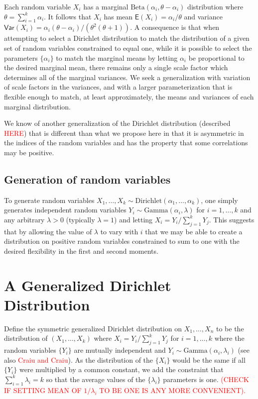 \documentclass[ba]{imsart}
\numberwithin{equation}{section}
\theoremstyle{plain}
\newcommand{\falta}[1]{\textcolor{red}{#1}}
\begin{document}
Each random variable $X_i$ has a marginal
$\text{Beta}(\alpha_i,\theta-\alpha_i)$ distribution where $\theta =
\sum_{i=1}^k \alpha_i$.  It follows that $X_i$ has mean
$\mathsf{E}(X_i) = \alpha_i/\theta$ and variance $\mathsf{Var}(X_i) =
\alpha_i(\theta-\alpha_i) / ( \theta^2(\theta+1) )$.  A consequence is
that when attempting to select a Dirichlet distribution to match the
distribution of a given set of random variables constrained to equal
one, while it is possible to select the parameters $\{\alpha_i\}$ to
match the marginal means by letting $\alpha_i$ be proportional to the
desired marginal mean, there remains only a single scale factor which
determines all of the marginal variances.  We seek a generalization
with variation of scale factors in the variances, and with a larger
parameterization that is flexible enough to match, at least
approximately, the means and variances of each marginal distribution.

We know of another generalization of the Dirichlet distribution
(described \falta{HERE}) that is different than what we propose here
in that it is asymmetric in the indices of the random variables and
has the property that some correlations may be positive.

\subsection{Generation of random variables}

To generate random variables $X_1,\ldots,X_k \sim
\text{Dirichlet}(\alpha_1,\ldots,\alpha_k)$, one simply generates
independent random variables $Y_i \sim \text{Gamma}(\alpha_i,\lambda)$
for $i=1,\ldots,k$ and any arbitrary $\lambda>0$ (typically
$\lambda=1$) and letting $X_i = Y_i / \sum_{j=1}^k Y_j$.  This
suggests that by allowing the value of $\lambda$ to vary with $i$ that
we may be able to create a distribution on positive random variables
constrained to sum to one with the desired flexibility in the first
and second moments.

\section{A Generalized Dirichlet Distribution}

Define the symmetric generalized Dirichlet distribution on
$X_1,\ldots,X_n$ to be the distribution of $(X_1,\ldots,X_k)$ where
$X_i = Y_i \big/ \sum_{j=1}^k Y_j$ for $i=1,\ldots,k$ where the random
variables $\{Y_i\}$ are mutually independent and $Y_i \sim
\text{Gamma}(\alpha_i,\lambda_i)$ (see also \falta{Craiu and Craiu}).  As the distribution of the
$\{X_i\}$ would be the same if all $\{Y_i\}$ were multiplied by a
common constant, we add the constraint that $\sum_{i=1}^k \lambda_i =
k$ so that the average values of the $\{\lambda_i\}$ parameters is
one.  \falta{(CHECK IF SETTING MEAN OF $1/\lambda_i$ TO BE ONE IS ANY MORE
CONVENIENT).}
\end{document}
